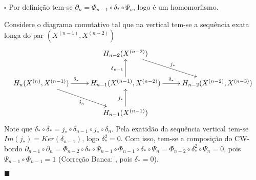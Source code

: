 \documentclass[12pt]{book}
\newenvironment{prova}[1]{$\square$ #1}{\hfill$\blacksquare$}
\newcommand{\homologiaabrev}[2]{H_{#1}(#2)}
\newcommand{\homologiarelskele}[3]{H_{#1}(X^{(#2)}, X^{(#3)})}
\newcommand{\skeleton}[1]{X^{(#1)}}
\newcommand{\alerta}[1]{{\color{red}#1}}
\newcommand{\correcaobanca}[1]{\alerta{(Correção Banca: #1)}}
\begin{document}
	\begin{prova}
		Por definição tem-se $\partial_{n} = \Phi_{n-1} \circ \delta_{*} \circ \Psi_{n}$, logo é um homomorfismo.
		
		Considere o diagrama comutativo tal que na vertical tem-se a sequência exata longa do par $(\skeleton{n-1}, \skeleton{n-2})$
		$$
		\xymatrix{
			& \homologiaabrev{n-2}{\skeleton{n-2}}\ar[rd]^{j_{*}}
			\\
			\homologiarelskele{n}{n}{n-1} \ar[r]^{\delta_{*} \qquad}\ar[rd]_{\delta_{n}} &
			\homologiarelskele{n-1}{n-1}{n-2} \ar[u]^{\delta_{n-1}} \ar[r]^{ \delta_{*}}&
			\homologiarelskele{n-2}{n-2}{n-3}
			\\
			& \homologiaabrev{n-1}{\skeleton{n-1}}\ar[u]^{j_{*}}
		}
		$$
		Note que $\delta_{*} \circ \delta_{*} = j_{*} \circ \delta_{n-1} \circ j_{*} \circ \delta_{n}$. Pela exatidão da sequência vertical tem-se $Im(j_{*}) = Ker(\delta_{n-1})$, logo $\delta_{*}^{2}=0$. Com isso, tem-se a composição do CW-bordo $\partial_{n-1}\circ \partial_{n} = \Phi_{n-2} \circ \delta_{*} \circ \Psi_{n-1} \circ \Phi_{n-1} \circ \delta_{*} \circ \Psi_{n} = \Phi_{n-2} \circ \delta_{*}^{2} \circ \Psi_{n} =0$, pois \alerta{$\Psi_{n-1} \circ \Phi_{n-1}=1$} \correcaobanca{, pois $\delta_{*} = 0$}.
		

\end{prova}
\end{document}

